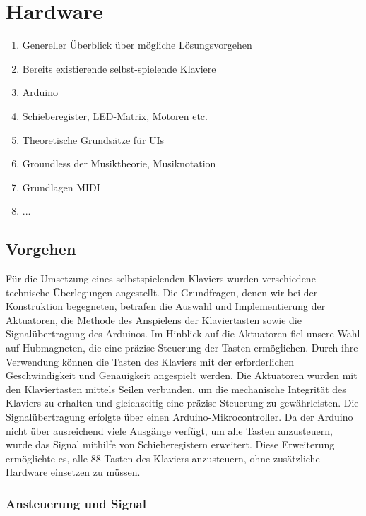 \chapter{Hardware}

\nocite{*}

\begin{enumerate}
	\item Genereller Überblick über mögliche Lösungsvorgehen
	\item Bereits existierende selbst-spielende Klaviere
	\item Arduino
	\item Schieberegister, LED-Matrix, Motoren etc.
	\item Theoretische Grundsätze für UIs
	\item Groundless der Musiktheorie, Musiknotation
	\item Grundlagen MIDI
	\item ...
\end{enumerate}
\newline

\section{Vorgehen}\label{Vorgehen - Hardware}

Für die Umsetzung eines selbstspielenden Klaviers wurden verschiedene technische Überlegungen angestellt.
Die Grundfragen, denen wir bei der Konstruktion begegneten, betrafen die Auswahl und Implementierung der
Aktuatoren, die Methode des Anspielens der Klaviertasten sowie die Signalübertragung des Arduinos.
Im Hinblick auf die Aktuatoren fiel unsere Wahl auf Hubmagneten, die eine präzise Steuerung der Tasten
ermöglichen. Durch ihre Verwendung können die Tasten des Klaviers mit der erforderlichen Geschwindigkeit und
Genauigkeit angespielt werden. \newline
Die Aktuatoren wurden mit den Klaviertasten mittels Seilen verbunden, um die mechanische Integrität des Klaviers
zu erhalten und gleichzeitig eine präzise Steuerung zu gewährleisten.\newline
Die Signalübertragung erfolgte über einen Arduino-Mikrocontroller. Da der Arduino nicht über ausreichend
viele Ausgänge verfügt, um alle Tasten anzusteuern, wurde das Signal mithilfe von Schieberegistern erweitert.
Diese Erweiterung ermöglichte es, alle 88 Tasten des Klaviers anzusteuern, ohne zusätzliche Hardware einsetzen
zu müssen.

\subsection{Ansteuerung und Signal}\label{Ansteuerung}

